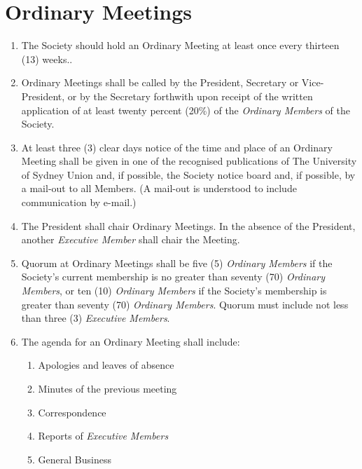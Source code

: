 \documentclass[11pt]{article}
\begin{document}
\section{Ordinary Meetings}
\begin{enumerate}[\thesection .1]
    \item The Society should hold an Ordinary Meeting at least once every thirteen (13) weeks..
    \item Ordinary Meetings shall be called by the President, Secretary or Vice-President, or by the Secretary forthwith upon receipt of the written application of at least twenty percent (20\%) of the \textit{Ordinary Members} of the Society.
    \item At least three (3) clear days notice of the time and place of an Ordinary Meeting shall be given in one of the recognised publications of The University of Sydney Union and, if possible, the Society notice board and, if possible, by a mail-out to all Members. (A mail-out is understood to include communication by e-mail.)
    \item The President shall chair Ordinary Meetings. In the absence of the President, another \textit{Executive Member} shall chair the Meeting.
    \item Quorum at Ordinary Meetings shall be five (5) \textit{Ordinary Members} if the Society’s current membership is no greater than seventy (70) \textit{Ordinary Members}, or ten (10) \textit{Ordinary Members} if the Society’s membership is greater than seventy (70) \textit{Ordinary Members}. Quorum must include not less than three (3) \textit{Executive Members}.
    \item The agenda for an Ordinary Meeting shall include:
    \begin{enumerate}[\hspace{5mm}1.]
        \item Apologies and leaves of absence
        \item Minutes of the previous meeting
        \item Correspondence
        \item Reports of \textit{Executive Members}
        \item General Business
    \end{enumerate}
    

\end{enumerate}
\end{document}
